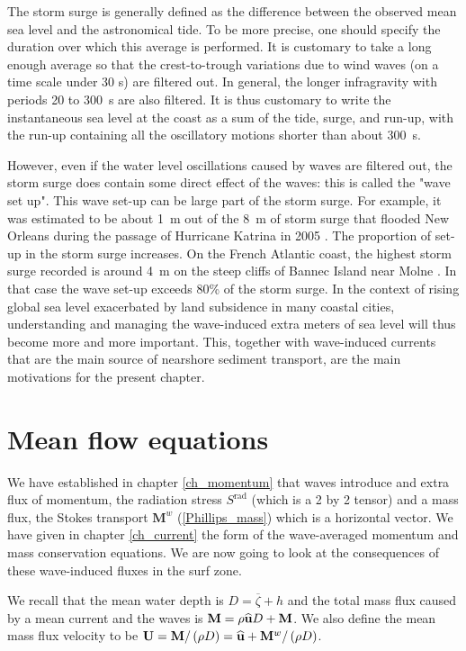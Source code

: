 The storm surge is generally defined as the difference between the observed mean sea level and the astronomical tide. To be more precise, one should specify the duration over which this average is performed. It is customary to take a long enough average so that the crest-to-trough variations due to wind waves (on a time scale under 30 s) are filtered out. In general, the longer infragravity with periods 20 to 300~s are also filtered. It is thus customary to write the instantaneous sea level at the coast as a sum of the tide, surge, and run-up, with the run-up containing all the oscillatory motions shorter than about 300~s. 

However, even if the water level oscillations caused by waves are filtered out, the storm surge does contain some direct effect of the waves: this is called the "wave set up". This wave set-up can be large part of the storm surge. For example, it was estimated to be about 1~m out of the 8~m of storm surge that flooded New Orleans during the passage of Hurricane Katrina in 2005  \citep{Resio&Westerink2008}. The proportion of set-up in the storm surge increases. On the French Atlantic coast, the highest storm surge recorded is around 4~m on the steep cliffs of Bannec Island near Molne \citep{Ardhuin&Magne2010,Sheremet&al.2014}. In that case the wave set-up exceeds 80\% of the storm surge. In the context of rising global sea level exacerbated by land subsidence in many coastal cities, understanding and managing the wave-induced extra meters of sea level will thus become more and more important. This, together with wave-induced currents that are the main source of nearshore sediment transport, are the main motivations for the present chapter. 

\section{Mean flow equations}
We have established in chapter \ref{ch_momentum} that waves introduce and extra flux of momentum, the radiation stress $S^{\mathrm{rad}}$ (which is a 2 by 2 tensor) and a mass flux, the Stokes transport ${\mathbf M^w}$ (\ref{Phillips_mass}) which is a horizontal vector. We have given in chapter \ref{ch_current} the form of the wave-averaged momentum and mass conservation equations. We are now going to look at the consequences of these wave-induced fluxes in the surf zone. 

We recall  that the mean water depth is 
$D=\overline{\zeta}+h$ and the total mass flux caused by a mean current and the waves is  ${\mathbf M}=\rho
{\mathbf {\widehat{u}}} D +{\mathbf M}$. We also define the mean mass flux velocity to be  ${\mathbf U}={\mathbf
M}/\left(\rho D\right) = {\mathbf {\widehat{u}}}+{\mathbf M^w}/\left(\rho
D\right)$. 

